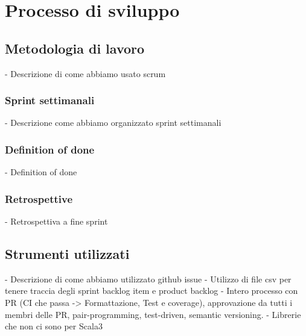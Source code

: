 \chapter{Processo di sviluppo}\label{ch:processo-di-sviluppo}
\section{Metodologia di lavoro}\label{sec:metodologia-di-lavoro}
- Descrizione di come abbiamo usato scrum
\subsection{Sprint settimanali}\label{subsec:sprint-settimanali}
- Descrizione come abbiamo organizzato sprint settimanali
\subsection{Definition of done}\label{subsec:definition-of-done}
- Definition of done
\subsection{Retrospettive}\label{subsec:retrospettive}
- Retrospettiva a fine sprint
\section{Strumenti utilizzati}\label{sec:strumenti-utilizzati}
- Descrizione di come abbiamo utilizzato github issue
- Utilizzo di file csv per tenere traccia degli sprint backlog item e product backlog
- Intero processo con PR (CI che passa -> Formattazione, Test e coverage), approvazione da tutti i membri delle PR, pair-programming, test-driven, semantic versioning.
- Librerie che non ci sono per Scala3